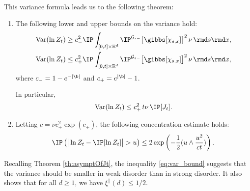 This variance formula leads us to the following theorem:
\begin{theorem} \label{th:var}
\begin{enumerate}[label=(\roman*)]
  \item The following lower and upper bounds on the variance hold:
  \begin{align}
\mathrm{Var} (\ln Z_t) &\geq c_-^2 \IP \int_{[0,t]\times\mathbb{R}^d} \IP^{\mathcal{G}_{s-}}\big[ \gibbs [\chi_{s,x}] \big]^2 \, \nu \hspace{0.5mm} \rmd s \rmd x,\\
\mathrm{Var} (\ln Z_t) &\leq c_+^2 \IP \int_{[0,t]\times\mathbb{R}^d} \IP^{\mathcal{G}_{s-}}\big[ \gibbs [\chi_{s,x}] \big]^2 \, \nu \hspace{0.5mm} \rmd s \rmd x, \label{eq:IneqVar}
  \end{align}
where $c_- = 1 - e^{-|\b|}$ and $c_+ = e^{|\b|}-1$.

In particular,
  \begin{equation}
  \mathrm{Var} (\ln Z_t) \leq c_+^2 \, t \nu \, \IP[J_t]. \label{eq:var_bound}
  \end{equation} 
  \item Letting $c=\nu c_+^2 \exp(c_+)$, the following concentration estimate holds:
  \begin{equation} \label{eq:concentrationlogZt}
  \IP\left(\big|\ln Z_t - \IP[\ln Z_t]\big| > u\right) \leq 2\exp\left(-\frac{1}{2}(u\wedge\frac{u^2}{ct})\right).
  \end{equation}
\end{enumerate}
\end{theorem}
\begin{remark} Recalling Theorem \ref{th:asymptOfJt}, the inequality \eqref{eq:var_bound} suggests that the variance should be smaller in weak disorder than in strong disorder. It also shows that for all $d\geq 1$, we have $\xi^{\parallel}(d)\leq 1/2$.
\end{remark}
